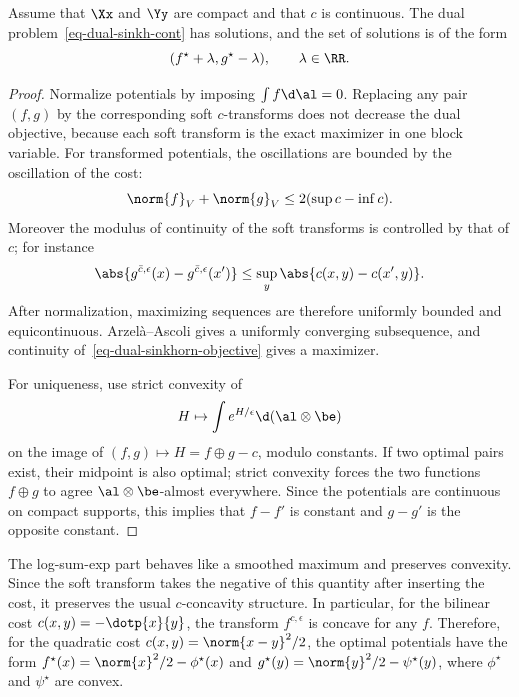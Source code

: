 \begin{prop}\label{prop-entropic-dual-potentials}
	Assume that $\Xx$ and $\Yy$ are compact and that $c$ is continuous. The dual problem~\eqref{eq-dual-sinkh-cont} has solutions, and the set of solutions is of the form
	\[
		(f^\star+\lambda,g^\star-\lambda),
		\qquad \lambda\in\RR .
	\]
\end{prop}

\begin{proof}
	Normalize potentials by imposing $\int f\d\al=0$. Replacing any pair $(f,g)$ by the corresponding soft $c$-transforms does not decrease the dual objective, because each soft transform is the exact maximizer in one block variable. For transformed potentials, the oscillations are bounded by the oscillation of the cost:
	\[
		\norm{f}_V+\norm{g}_V
		\leq
		2(\sup c-\inf c).
	\]
	Moreover the modulus of continuity of the soft transforms is controlled by that of $c$; for instance
	\[
		\abs{g^{\bar c,\epsilon}(x)-g^{\bar c,\epsilon}(x')}
		\leq
		\sup_y\abs{c(x,y)-c(x',y)}.
	\]
	After normalization, maximizing sequences are therefore uniformly bounded and equicontinuous. Arzel\`a--Ascoli gives a uniformly converging subsequence, and continuity of~\eqref{eq-dual-sinkhorn-objective} gives a maximizer.

	For uniqueness, use strict convexity of
	\[
		H\mapsto \int e^{H/\epsilon}\d(\al\otimes\be)
	\]
	on the image of $(f,g)\mapsto H=f\oplus g-c$, modulo constants. If two optimal pairs exist, their midpoint is also optimal; strict convexity forces the two functions $f\oplus g$ to agree $\al\otimes\be$-almost everywhere. Since the potentials are continuous on compact supports, this implies that $f-f'$ is constant and $g-g'$ is the opposite constant.
\end{proof}

\begin{rem}\label{rem-soft-transform-convexity}
	The log-sum-exp part behaves like a smoothed maximum and preserves convexity. Since the soft transform takes the negative of this quantity after inserting the cost, it preserves the usual $c$-concavity structure. In particular, for the bilinear cost $c(x,y)=-\dotp{x}{y}$, the transform $f^{c,\epsilon}$ is concave for any $f$. Therefore, for the quadratic cost $c(x,y)=\norm{x-y}^2/2$, the optimal potentials have the form $f^\star(x)=\norm{x}^2/2-\phi^\star(x)$ and $g^\star(y)=\norm{y}^2/2-\psi^\star(y)$, where $\phi^\star$ and $\psi^\star$ are convex.
\end{rem}

